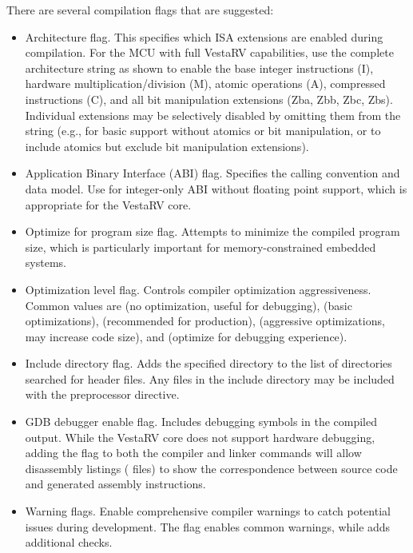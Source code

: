 \documentclass[11pt,pdftex,portrait,letterpaper]{article}
\begin{document}
There are several compilation flags that are suggested:
\begin{itemize}
\item {} Architecture flag. This specifies which ISA extensions are enabled during compilation. For the \AsicNameForUserGuide{} MCU with full VestaRV capabilities, use the complete architecture string as shown to enable the base integer instructions (I), hardware multiplication/division (M), atomic operations (A), compressed instructions (C), and all bit manipulation extensions (Zba, Zbb, Zbc, Zbs). Individual extensions may be selectively disabled by omitting them from the string (e.g.,  for basic support without atomics or bit manipulation, or  to include atomics but exclude bit manipulation extensions).

\item {} Application Binary Interface (ABI) flag. Specifies the calling convention and data model. Use  for integer-only ABI without floating point support, which is appropriate for the VestaRV core.

\item {} Optimize for program size flag. Attempts to minimize the compiled program size, which is particularly important for memory-constrained embedded systems.

\item {} Optimization level flag. Controls compiler optimization aggressiveness. Common values are  (no optimization, useful for debugging),  (basic optimizations),  (recommended for production),  (aggressive optimizations, may increase code size), and  (optimize for debugging experience).

\item {} Include directory flag. Adds the specified directory to the list of directories searched for header files. Any files in the include directory may be included with the  preprocessor directive.

\item {} GDB debugger enable flag. Includes debugging symbols in the compiled output. While the VestaRV core does not support hardware debugging, adding the  flag to both the compiler and linker commands will allow disassembly listings ( files) to show the correspondence between source code and generated assembly instructions.

\item {} Warning flags. Enable comprehensive compiler warnings to catch potential issues during development. The  flag enables common warnings, while  adds additional checks.
\end{itemize}
\end{document}

